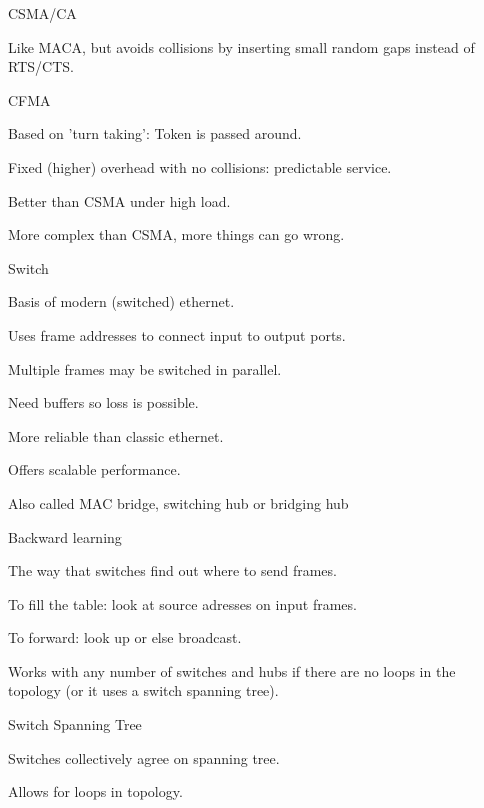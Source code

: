 \documentclass[main.tex]{subfiles}
\begin{document}
\begin{card}{CSMA/CA}
\item Like MACA, but avoids collisions by inserting small random gaps instead of RTS/CTS.
\end{card}

\begin{card}{CFMA}
\item Based on 'turn taking': Token is passed around.
\item Fixed (higher) overhead with no collisions: predictable service.
\item Better than CSMA under high load.
\item More complex than CSMA, more things can go wrong.
\end{card}

\begin{card}{Switch}
\item Basis of modern (switched) ethernet.
\item Uses frame addresses to connect input to output ports.
\item Multiple frames may be switched in parallel.
\item Need buffers so loss is possible.
\item More reliable than classic ethernet.
\item Offers scalable performance.
\item Also called MAC bridge, switching hub or bridging hub
\end{card}

\begin{card}{Backward learning}
\item The way that switches find out where to send frames.
\item To fill the table: look at source adresses on input frames.
\item To forward: look up or else broadcast.
\item Works with any number of switches and hubs if there are no loops in the topology (or it uses a switch spanning tree).
\end{card}

\begin{card}{Switch Spanning Tree}
\item Switches collectively agree on spanning tree.
\item Allows for loops in topology.
\end{card}
\end{document}
